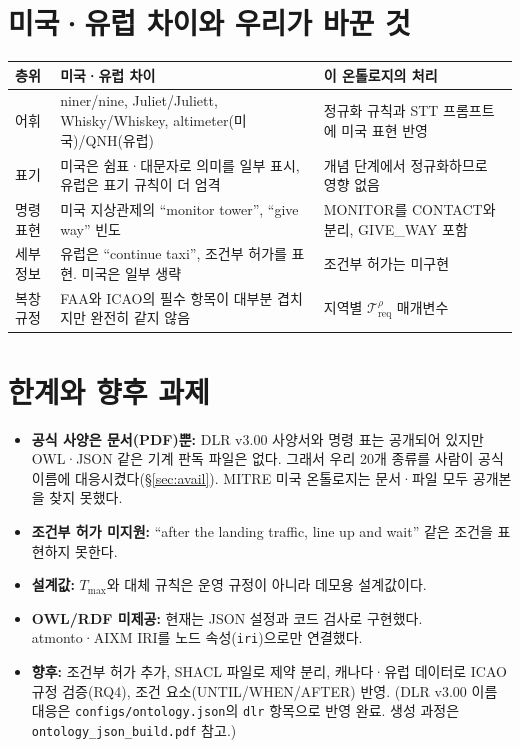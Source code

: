 \documentclass[10pt,a4paper]{article}
\newcommand{\cmd}[1]{\textsf{\small #1}}
\begin{document}
\section{미국·유럽 차이와 우리가 바꾼 것}
\begin{center}\small
\begin{tabularx}{\textwidth}{@{}>{\raggedright\arraybackslash}p{3.6cm}>{\raggedright\arraybackslash}X>{\raggedright\arraybackslash}X@{}}
\toprule
층위 & 미국·유럽 차이 \cite{chen2023,helmke2025loss} & 이 온톨로지의 처리\\\midrule
어휘 & niner/nine, Juliet/Juliett, Whisky/Whiskey, altimeter(미국)/QNH(유럽) & 정규화 규칙과 STT 프롬프트에 미국 표현 반영\\
표기 & 미국은 쉼표·대문자로 의미를 일부 표시, 유럽은 표기 규칙이 더 엄격 & 개념 단계에서 정규화하므로 영향 없음\\
명령 표현 & 미국 지상관제의 ``monitor tower'', ``give way'' 빈도 & \cmd{MONITOR}를 \cmd{CONTACT}와 분리, \cmd{GIVE\_WAY} 포함\\
세부 정보 & 유럽은 ``continue taxi'', 조건부 허가를 표현. 미국은 일부 생략 & 조건부 허가는 미구현\\
복창 규정 & FAA와 ICAO의 필수 항목이 대부분 겹치지만 완전히 같지 않음 & 지역별 $\mathcal{T}_{\mathrm{req}}^{\rho}$ 매개변수\\
\bottomrule
\end{tabularx}
\end{center}

\section{한계와 향후 과제}
\begin{caveat}
\begin{itemize}[leftmargin=12pt]
\item \textbf{공식 사양은 문서(PDF)뿐:} DLR v3.00 사양서와 명령 표는 공개되어 있지만 OWL·JSON 같은 기계 판독 파일은 없다. 그래서 우리 20개 종류를 사람이 공식 이름에 대응시켰다(\S\ref{sec:avail}). MITRE 미국 온톨로지는 문서·파일 모두 공개본을 찾지 못했다.
\item \textbf{조건부 허가 미지원:} ``after the landing traffic, line up and wait'' 같은 조건을 표현하지 못한다.
\item \textbf{설계값:} $T_{\max}$와 대체 규칙은 운영 규정이 아니라 데모용 설계값이다.
\item \textbf{OWL/RDF 미제공:} 현재는 JSON 설정과 코드 검사로 구현했다. atmonto·AIXM IRI를 노드 속성(\texttt{iri})으로만 연결했다.
\item \textbf{향후:} 조건부 허가 추가, SHACL 파일로 제약 분리, 캐나다·유럽 데이터로 ICAO 규정 검증(RQ4), 조건 요소(UNTIL/WHEN/AFTER) 반영. (DLR v3.00 이름 대응은 \texttt{configs/ontology.json}의 \texttt{dlr} 항목으로 반영 완료. 생성 과정은 \texttt{ontology\_json\_build.pdf} 참고.)
\end{itemize}
\end{caveat}
\end{document}
